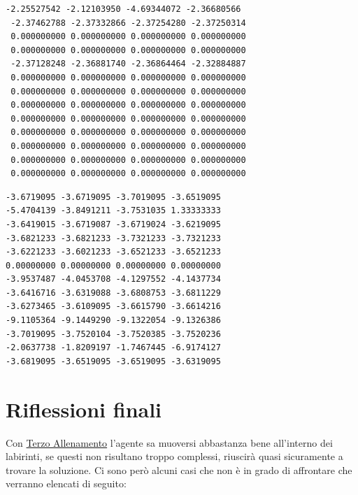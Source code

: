 \begin{minipage}{\textwidth}
	\begin{minipage}{.45\textwidth}
		\begin{lstlisting}[style=python, basicstyle=\tiny, caption={Alcune righe della matrice Q di Secondo Allenamento}]
 -2.25527542 -2.12103950 -4.69344072 -2.36680566
 -2.37462788 -2.37332866 -2.37254280 -2.37250314
 0.000000000 0.000000000 0.000000000 0.000000000
 0.000000000 0.000000000 0.000000000 0.000000000
 -2.37128248 -2.36881740 -2.36864464 -2.32884887
 0.000000000 0.000000000 0.000000000 0.000000000
 0.000000000 0.000000000 0.000000000 0.000000000
 0.000000000 0.000000000 0.000000000 0.000000000
 0.000000000 0.000000000 0.000000000 0.000000000
 0.000000000 0.000000000 0.000000000 0.000000000
 0.000000000 0.000000000 0.000000000 0.000000000
 0.000000000 0.000000000 0.000000000 0.000000000
 0.000000000 0.000000000 0.000000000 0.000000000
		\end{lstlisting}
	\end{minipage}
	\hfill
	\begin{minipage}{.45\textwidth}
		\begin{lstlisting}[style=python, basicstyle=\tiny, caption={Alcune righe della matrice Q di Terzo Allenamento}]
-3.6719095 -3.6719095 -3.7019095 -3.6519095
-5.4704139 -3.8491211 -3.7531035 1.33333333
-3.6419015 -3.6719087 -3.6719024 -3.6219095
-3.6821233 -3.6821233 -3.7321233 -3.7321233
-3.6221233 -3.6021233 -3.6521233 -3.6521233
0.00000000 0.00000000 0.00000000 0.00000000
-3.9537487 -4.0453708 -4.1297552 -4.1437734
-3.6416716 -3.6319088 -3.6808753 -3.6811229
-3.6273465 -3.6109095 -3.6615790 -3.6614216
-9.1105364 -9.1449290 -9.1322054 -9.1326386
-3.7019095 -3.7520104 -3.7520385 -3.7520236
-2.0637738 -1.8209197 -1.7467445 -6.9174127
-3.6819095 -3.6519095 -3.6519095 -3.6319095
		\end{lstlisting}
	\end{minipage}
\end{minipage}

\section{Riflessioni finali}

Con \hyperref[sec:terzo]{Terzo Allenamento} l'agente sa muoversi abbastanza bene all'interno dei labirinti, se questi non risultano troppo complessi, riuscir\`{a} quasi sicuramente a trovare la soluzione.
Ci sono per\`{o} alcuni casi che non \`{e} in grado di affrontare che verranno elencati di seguito:


